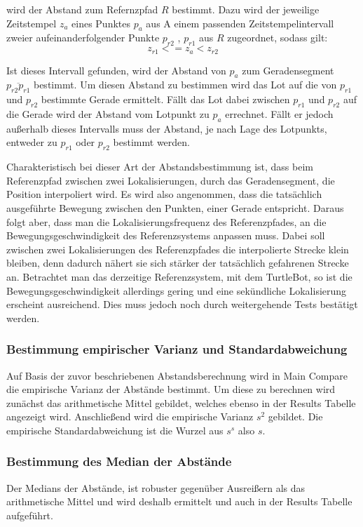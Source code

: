 wird der Abstand zum Refernzpfad $R$ bestimmt. Dazu wird der jeweilige
Zeitstempel $z_a$ eines Punktes $p_a$ aus A einem passenden
Zeitstempelintervall zweier aufeinanderfolgender Punkte $p_{r2}$ , $p_{r1}$ aus $R$ zugeordnet, sodass
gilt:
\[
z_{r1} <= z_a < z_{r2}
\]

Ist dieses Intervall gefunden, wird der Abstand von $p_a$ zum Geradensegment
$\overline{p_{r2} p_{r1}}$ bestimmt. Um diesen Abstand zu bestimmen wird das
Lot auf die von $p_{r1}$ und $p_{r2}$ bestimmte Gerade ermittelt. Fällt das Lot
dabei zwischen $p_{r1}$ und $p_{r2}$ auf die Gerade wird der Abstand vom
Lotpunkt zu $p_a$ errechnet. Fällt er jedoch außerhalb dieses Intervalls muss
der Abstand, je nach Lage des Lotpunkts, entweder zu $p_{r1}$ oder $p_{r2}$
bestimmt werden. 

Charakteristisch bei dieser Art der Abstandsbestimmung ist, dass beim
Referenzpfad zwischen zwei Lokalisierungen, durch das Geradensegment, die
Position interpoliert wird. Es wird also angenommen, dass die tatsächlich
ausgeführte Bewegung zwischen den Punkten, einer Gerade entspricht. Daraus
folgt aber, dass man die Lokalisierungsfrequenz des Referenzpfades, an die
Bewegungsgeschwindigkeit des Referenzsystems anpassen muss. Dabei soll
zwischen zwei Lokalisierungen des Referenzpfades die interpolierte Strecke
klein bleiben, denn dadurch nähert sie sich stärker der tatsächlich gefahrenen
Strecke an. Betrachtet man das derzeitige Referenzsystem, mit dem TurtleBot, so
ist die Bewegungsgeschwindigkeit allerdings gering und eine sekündliche
Lokalisierung erscheint ausreichend. Dies muss jedoch noch durch weitergehende
Tests bestätigt werden.


\subsubsection{Bestimmung empirischer Varianz und Standardabweichung}
Auf Basis der zuvor beschriebenen Abstandsberechnung wird in Main Compare die
empirische Varianz der Abstände bestimmt. Um diese zu berechnen wird zunächst
das arithmetische Mittel gebildet, welches ebenso in der Results Tabelle angezeigt wird.
Anschließend wird die empirische Varianz $s^2$ gebildet. Die empirische Standardabweichung
ist die Wurzel aus $s^s$ also $s$.

\subsubsection{Bestimmung des Median der Abstände}
Der Medians der Abstände, ist robuster gegenüber Ausreißern als das
arithmetische Mittel und wird deshalb ermittelt und auch in der Results Tabelle
aufgeführt.

